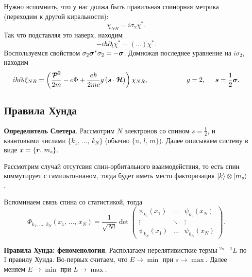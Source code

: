 Нужно вспомнить, что у нас должа быть правильная спинорная метрика (переходим к другой киральности):
\begin{equation*}
	\chi_{NR} = i \sigma_2 \chi^*.
\end{equation*}
Так что подставляя это наверх, находим
\begin{equation*}
	- i \hbar \partial_t \chi^* = \left(\ldots\right) \chi^*.
\end{equation*}
Воспользуемся свойством $\sigma_2 \mbox{\boldmath $\sigma$}^* \sigma_2 = - \mbox{\boldmath $\sigma$}$. Домножая последнее уравнение на $i \sigma_2$, находим
\begin{equation*}
	i \hbar \partial_t \xi_{NR} = \left(
		\frac{\vc{\mathcal P}^2}{2m} - e \Phi + \frac{e \hbar}{2 m c} g 
		\left(
			\vc{s} \cdot \vc{\mathcal H}
		\right)
	\right) \chi_{NR},
	\hspace{20 mm} 
	g=2, \hspace{5 mm} 
	\vc{s} = \frac{1}{2} \vc{\sigma}.
\end{equation*}







\subsection*{Правила Хунда}

\textbf{Определитель Слетера}. Рассмотрим $N$ электронов со спином $s=\frac{1}{2}$, и квантовыми числами $\{k_1,\, \ldots,\, k_N\}$ (обычно $\{n,\, l,\, m\}$). Далее описываем систему в виде $x = \{\mbox{\boldmath $r$},\, m_s\}$.

Рассмотрим случай отсутсвия спин-орбитального взаимодействия, то есть спин коммутирует с гамильтонианом, тогда будет иметь место факторизация $\left| k \right\rangle \otimes \left| m_s \right\rangle$.

Вспоминаем связь спина со статистикой, тогда
\begin{equation*}
	\Phi_{k_1,\, \ldots,\, k_N} (x_1,\, \ldots,\, x_N) = 
	\frac{1}{\sqrt{N!}} \det \begin{pmatrix}
		\psi_{k_1} (x_1) & \ldots & \psi_{k_1} (x_N) \\
		\vdots & \ddots & \vdots \\
		\psi_{k_N} (x_1) & \ldots & \psi_{k_N} (x_N)
	\end{pmatrix}.
\end{equation*}

\textbf{Правила Хунда: феноменология}. 
Располагаем нерелятивисткие термы ${}^{2s+1}L$ по I правилу Хунда. 
Во-первых считаем, что $E\to \min$ при $s \to \max$. 
Далее меняем $E \to \min$ при $L \to \max$.


